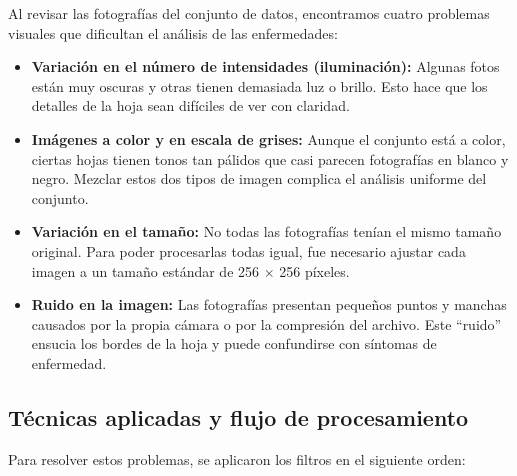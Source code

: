\documentclass[11pt,a4paper]{article}
\begin{document}
Al revisar las fotografías del conjunto de datos, encontramos cuatro problemas visuales
que dificultan el análisis de las enfermedades:

\begin{itemize}
    \item \textbf{Variación en el número de intensidades (iluminación):} Algunas fotos
    están muy oscuras y otras tienen demasiada luz o brillo. Esto hace que los detalles
    de la hoja sean difíciles de ver con claridad.
    
    \item \textbf{Imágenes a color y en escala de grises:} Aunque el conjunto está a color,
    ciertas hojas tienen tonos tan pálidos que casi parecen fotografías en blanco y negro.
    Mezclar estos dos tipos de imagen complica el análisis uniforme del conjunto.

    \item \textbf{Variación en el tamaño:} No todas las fotografías tenían el mismo tamaño
    original. Para poder procesarlas todas igual, fue necesario ajustar cada imagen a un
    tamaño estándar de 256 $\times$ 256 píxeles.

    \item \textbf{Ruido en la imagen:} Las fotografías presentan pequeños puntos y manchas
    causados por la propia cámara o por la compresión del archivo. Este ``ruido'' ensucia
    los bordes de la hoja y puede confundirse con síntomas de enfermedad.
\end{itemize}

\subsection{Técnicas aplicadas y flujo de procesamiento}

Para resolver estos problemas, se aplicaron los filtros en el siguiente orden:
\end{document}
